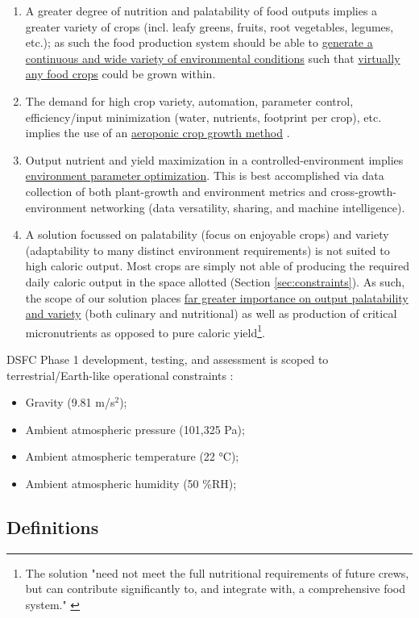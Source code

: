 \documentclass{report}
\begin{document}
\begin{enumerate}[label=SC\arabic*., ref=SC\arabic*]
\newpage
\item \label{sc:5} A greater degree of nutrition and palatability of food outputs implies a greater variety of crops (incl. leafy greens, fruits, root vegetables, legumes, etc.); as such the food production system should be able to \uline{generate a continuous and wide variety of environmental conditions} such that \uline{virtually any food crops} could be grown within.
\item \label{sc:6} The demand for high crop variety, automation, parameter control, efficiency/input minimization (water, nutrients, footprint per crop), etc. implies the use of an \uline{aeroponic crop growth method} \cite{spinoff}.
\item \label{sc:7} Output nutrient and yield maximization in a controlled-environment implies \uline{environment parameter optimization}. 
    This is best accomplished via data collection of both plant-growth and environment metrics and cross-growth-environment networking (data versatility, sharing, and machine intelligence).
\item \label{sc:8} A solution focussed on palatability (focus on enjoyable crops) and variety (adaptability to many distinct environment requirements) is not suited to high caloric output. 
    Most crops are simply not able of producing the required daily caloric output in the space allotted (Section \ref{sec:constraints}). 
    As such, the scope of our solution places \uline{far greater importance on output palatability and variety} (both culinary and nutritional) as well as production of critical micronutrients as opposed to pure caloric 
    yield\footnote{The solution "need not meet the full nutritional requirements of future crews, but can contribute significantly to, and integrate with, a comprehensive food system." \cite{applicantguide}}.
\end{enumerate}
DSFC Phase 1 development, testing, and assessment is scoped to terrestrial/Earth-like operational constraints \cite{applicantguide,dsfc-phase2}:
\begin{itemize}
    \item Gravity (9.81 m/s${}^2$);
    \item Ambient atmospheric pressure (101,325 Pa);
    \item Ambient atmospheric temperature (22 °C);
    \item Ambient atmospheric humidity (50 \%RH);
\end{itemize}

\newpage
\subsection{Definitions}
\label{sec:definitions}
\end{document}
